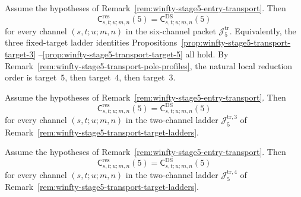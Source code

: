 \begin{proposition}
\label{prop:winfty-stage5-transport-identities}
\ClaimStatusConditional{}
Assume the hypotheses of
Remark~\ref{rem:winfty-stage5-entry-transport}. Then
\[
\mathsf{C}^{\mathrm{res}}_{s,t;u;m,n}(5)
=
\mathsf{C}^{\mathrm{DS}}_{s,t;u;m,n}(5)
\]
for every channel $(s,t;u;m,n)$ in the six-channel packet
$\mathcal{J}_5^{\mathrm{tr}}$. Equivalently, the three fixed-target
ladder identities
Propositions~\ref{prop:winfty-stage5-transport-target-3}
--\ref{prop:winfty-stage5-transport-target-5}
all hold. By
Remark~\ref{rem:winfty-stage5-transport-pole-profiles}, the
natural local reduction order is target~$5$, then target~$4$, then
target~$3$.
\end{proposition}

\begin{proposition}
\label{prop:winfty-stage5-transport-target-3}
\ClaimStatusProvedElsewhere{}
Assume the hypotheses of
Remark~\ref{rem:winfty-stage5-entry-transport}. Then
\[
\mathsf{C}^{\mathrm{res}}_{s,t;u;m,n}(5)
=
\mathsf{C}^{\mathrm{DS}}_{s,t;u;m,n}(5)
\]
for every channel $(s,t;u;m,n)$ in the two-channel ladder
$\mathcal{J}_5^{\mathrm{tr},3}$ of
Remark~\ref{rem:winfty-stage5-transport-target-ladders}.
\end{proposition}

\begin{proposition}
\label{prop:winfty-stage5-transport-target-4}
\ClaimStatusProvedElsewhere{}
Assume the hypotheses of
Remark~\ref{rem:winfty-stage5-entry-transport}. Then
\[
\mathsf{C}^{\mathrm{res}}_{s,t;u;m,n}(5)
=
\mathsf{C}^{\mathrm{DS}}_{s,t;u;m,n}(5)
\]
for every channel $(s,t;u;m,n)$ in the two-channel ladder
$\mathcal{J}_5^{\mathrm{tr},4}$ of
Remark~\ref{rem:winfty-stage5-transport-target-ladders}.
\end{proposition}

